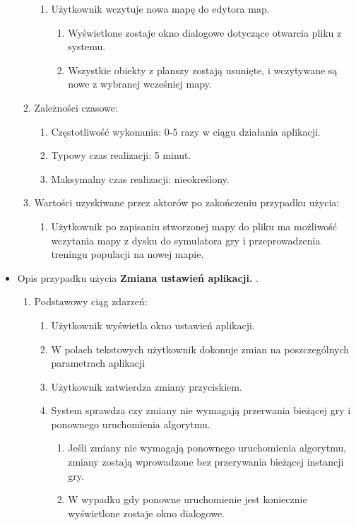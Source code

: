 \begin{par}
\begin{itemize}
\begin{enumerate}
\begin{enumerate}
		\item Użytkownik wczytuje nowa mapę do edytora map. 
			\begin{enumerate}
			\item Wyświetlone zostaje okno dialogowe dotyczące otwarcia pliku z systemu.
			\item Wszystkie obiekty z planszy zostają usunięte, i wczytywane są nowe z wybranej wcześniej mapy.
			\end{enumerate}
		\end{enumerate}
	\item Zależności czasowe:
		\begin{enumerate}
		\item Częstotliwość wykonania: 0-5 razy w ciągu działania aplikacji.
		\item Typowy czas realizacji: 5 minut.
		\item Maksymalny czas realizacji: nieokreślony.
		\end{enumerate}
	\item Wartości uzyskiwane przez aktorów po zakończeniu przypadku użycia:
		\begin{enumerate}
		\item Użytkownik po zapisaniu stworzonej mapy do pliku ma możliwość wczytania mapy z dysku do symulatora gry i przeprowadzenia treningu populacji na nowej mapie.
		\end{enumerate}
	\end{enumerate}
	\item
	Opis przypadku użycia {\bf Zmiana ustawień aplikacji. }.
	\begin{enumerate}
	\item Podstawowy ciąg zdarzeń:
		\begin{enumerate}
		\item Użytkownik wyświetla okno ustawień aplikacji.
		\item W polach tekstowych użytkownik dokonuje zmian na poszczególnych parametrach aplikacji
		\item Użytkownik zatwierdza zmiany przyciskiem.
		\item System sprawdza czy zmiany nie wymagają przerwania bieżącej gry i ponownego uruchomienia algorytmu.
		\begin{enumerate}
			\item Jeśli zmiany nie wymagają ponownego uruchomienia algorytmu, zmiany zostają wprowadzone bez przerywania bieżącej instancji gry.
			\item W wypadku gdy ponowne uruchomienie jest koniecznie wyświetlone zostaje okno dialogowe.

\end{enumerate}
\end{enumerate}
\end{enumerate}
\end{itemize}
\end{par}
